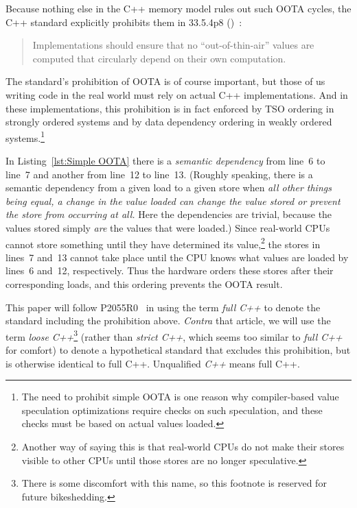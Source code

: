 \documentclass[10]{article}
\begin{document}
Because nothing else in the C++ memory model rules out such OOTA cycles,
the C++ standard explicitly prohibits them in 33.5.4p8
()~\cite{ThomasKoeppe2023N4950}:
\begin{quote}
	Implementations should ensure that no “out-of-thin-air” values
	are computed that circularly depend on their own computation.
\end{quote}
The standard's prohibition of OOTA is of course important, but those of us
writing code in the real world must rely on actual C++ implementations.
And in these implementations, this prohibition is in fact enforced by TSO
ordering in strongly ordered systems and by data dependency ordering in
weakly ordered systems.\footnote{
	The need to prohibit simple OOTA is one reason why compiler-based
	value speculation optimizations require checks on such
	speculation, and these checks must be based on actual values
	loaded.}

In Listing~\ref{lst:Simple OOTA}
there is a \emph{semantic dependency} from line~6 to line~7 and
another from line~12 to line~13.
(Roughly speaking, there is a semantic dependency from a given load
to a given store when \emph{all other things being equal, a change in the
value loaded can change the value stored or prevent the store from
occurring at all.}
Here the dependencies are trivial, because the values stored simply
\emph{are} the values that were loaded.)
Since real-world CPUs cannot store something
until they have determined its value,\footnote{
	Another way of saying this is that real-world CPUs do not
	make their stores visible to other CPUs until those stores
	are no longer speculative.}
the stores in lines~7 and~13 cannot take place until the CPU
knows what values are loaded by lines~6 and~12, respectively.
Thus the hardware orders these stores after their corresponding loads,
and this ordering prevents the OOTA result.

This paper will follow P2055R0~\cite{PaulEMcKenney2020RelaxedGuideRelaxed}
in using the term \emph{full C++} to denote the standard including the
prohibition above.
{\it Contra\/} that article, we will use the term \emph{loose C++}\footnote{
	There is some discomfort with this name, so this footnote
	is reserved for future bikeshedding.}
(rather than \emph{strict C++}, which seems too similar to
\emph{full C++} for comfort)
to denote a hypothetical standard that excludes this prohibition, but
is otherwise identical to full C++.
Unqualified \emph{C++} means full C++.
\end{document}
